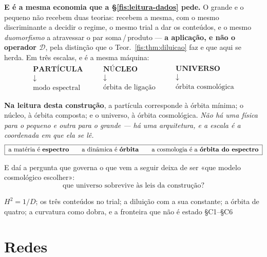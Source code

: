 \documentclass[livro.tex]{subfiles}
\begin{document}
\medskip\noindent\textbf{E é a mesma economia que a §\ref{fis:leitura-dados}
pede.} O grande e o pequeno não recebem duas teorias: recebem a mesma, com o
mesmo discriminante a decidir o regime, o mesmo trial a dar os conteúdos, e o
mesmo \emph{duomorfismo} a atravessar o par soma\,/\,produto --- \textbf{a
aplicação, e não o operador $\mathcal{D}$}, pela distinção que o
Teor.~\ref{fis:thm:diluicao} faz e que aqui se herda. Em três escalas, e é a
mesma máquina:
\[
\boxed{\;
\begin{array}{c}
\textbf{PARTÍCULA}\\ \downarrow\\ \text{modo espectral}
\end{array}
\qquad
\begin{array}{c}
\textbf{NÚCLEO}\\ \downarrow\\ \text{órbita de ligação}
\end{array}
\qquad
\begin{array}{c}
\textbf{UNIVERSO}\\ \downarrow\\ \text{órbita cosmológica}
\end{array}
\;}
\]

\medskip\noindent\textbf{Na leitura desta construção}, a partícula corresponde à
órbita mínima; o núcleo, à órbita composta; e o universo, à órbita cosmológica.
\emph{Não há uma física para o pequeno e outra para o grande --- há uma
arquitetura, e a escala é a coordenada em que ela se lê.}
\[
\boxed{\;\text{a matéria é \textbf{espectro}}\qquad
\text{a dinâmica é \textbf{órbita}}\qquad
\text{a cosmologia é a \textbf{órbita do espectro}}\;}
\]

\medskip\noindent E daí a pergunta que governa o que vem a seguir deixa de ser
«que modelo cosmológico escolher»:
\[
\boxed{\;\text{que universo sobrevive às leis da construção?}\;}
\]

        {$H^{2}=1/D$; os três conteúdos no trial; a diluição com a sua constante; a órbita de quatro; a curvatura como dobra, e a fronteira que não é estado}
        { §C1--§C6}

\part{Redes}
\end{document}
